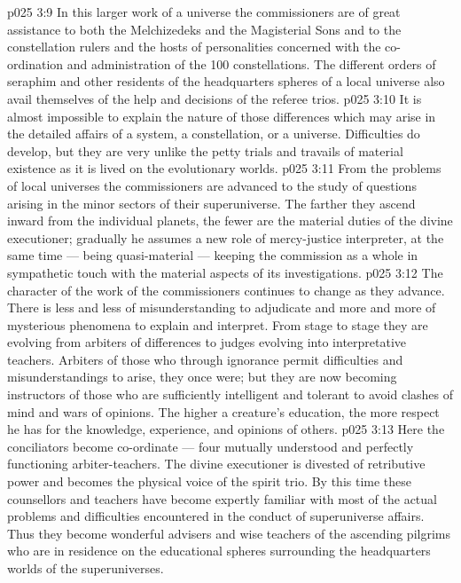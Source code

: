 \vs p025 3:9 \bibnobreakspace {} In this larger work of a universe the commissioners are of great assistance to both the Melchizedeks and the Magisterial Sons and to the constellation rulers and the hosts of personalities concerned with the co\hyp{}ordination and administration of the 100 constellations. The different orders of seraphim and other residents of the headquarters spheres of a local universe also avail themselves of the help and decisions of the referee trios.
\vs p025 3:10 It is almost impossible to explain the nature of those differences which may arise in the detailed affairs of a system, a constellation, or a universe. Difficulties do develop, but they are very unlike the petty trials and travails of material existence as it is lived on the evolutionary worlds.
\vs p025 3:11 \bibnobreakspace {} From the problems of local universes the commissioners are advanced to the study of questions arising in the minor sectors of their superuniverse. The farther they ascend inward from the individual planets, the fewer are the material duties of the divine executioner; gradually he assumes a new role of mercy\hyp{}justice interpreter, at the same time --- being quasi\hyp{}material --- keeping the commission as a whole in sympathetic touch with the material aspects of its investigations.
\vs p025 3:12 \bibnobreakspace {} The character of the work of the commissioners continues to change as they advance. There is less and less of misunderstanding to adjudicate and more and more of mysterious phenomena to explain and interpret. From stage to stage they are evolving from arbiters of differences to  judges evolving into interpretative teachers. Arbiters of those who through ignorance permit difficulties and misunderstandings to arise, they once were; but they are now becoming instructors of those who are sufficiently intelligent and tolerant to avoid clashes of mind and wars of opinions. The higher a creature’s education, the more respect he has for the knowledge, experience, and opinions of others.
\vs p025 3:13 \bibnobreakspace {} Here the conciliators become co\hyp{}ordinate --- four mutually understood and perfectly functioning arbiter\hyp{}teachers. The divine executioner is divested of retributive power and becomes the physical voice of the spirit trio. By this time these counsellors and teachers have become expertly familiar with most of the actual problems and difficulties encountered in the conduct of superuniverse affairs. Thus they become wonderful advisers and wise teachers of the ascending pilgrims who are in residence on the educational spheres surrounding the headquarters worlds of the superuniverses.
